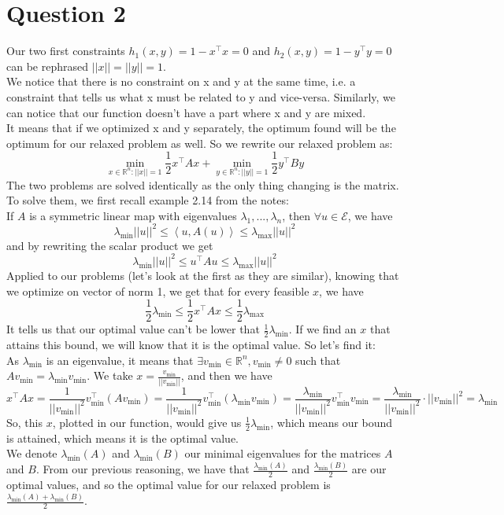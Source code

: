 \documentclass{article}
\newcommand{\R}{\mathbb{R}}
\begin{document}
\section*{Question 2}

Our two first constraints $h_1(x,y)=1-x^\top x =0$ and $h_2(x,y)=1-y^\top y =0$ can be rephrased $||x||=||y||=1$.\\
We notice that there is no constraint on x and y at the same time, i.e. a constraint that tells us what x must be related to y and vice-versa. Similarly, we can notice that our function doesn't have a part where x and y are mixed.\\
It means that if we optimized x and y separately, the optimum found will be the optimum for our relaxed problem as well. So we rewrite our relaxed problem as:
$$\min_{x\in \R^n:||x||=1}  \frac{1}{2} x^\top A x +\min_{y \in \R^n:||y||=1} \frac{1}{2} y^\top B y$$
The two problems are solved identically as the only thing changing is the matrix. To solve them, we first recall example 2.14 from the notes:\\
If $A$ is a symmetric linear map with eigenvalues $\lambda_1, ...,\lambda_n$, then $\forall u \in \mathcal{E}$, we have $$\lambda_{\min} ||u||^2 \leq \left< u, A(u)\right>\leq \lambda_{\max}||u||^2$$
and by rewriting the scalar product we get 
$$\lambda_{\min} ||u||^2 \leq u^\top A u \leq \lambda_{\max} ||u||^2$$
Applied to our problems (let's look at the first as they are similar), knowing that we optimize on vector of norm 1, we get that for every feasible $x$, we have
$$\frac{1}{2}\lambda_{\min}  \leq\frac{1}{2} x^\top A x \leq\frac{1}{2} \lambda_{\max} $$
It tells us that our optimal value can't be lower that $\frac{1}{2} \lambda_{\min}$. If we find an $x$ that attains this bound, we will know that it is the optimal value. So let's find it:\\
As $\lambda_{\min}$ is an eigenvalue, it means that $\exists v_{\min} \in \R^n, v_{\min} \neq 0$ such that $A v_{\min}=\lambda_{\min} v_{\min}$. We take $x=\frac{v_{\min}}{||v_{\min}||}$, and then we have
$$x^\top A x =\frac{1}{||v_{\min}||^2} v_{\min}^\top \left( A v_{\min} \right)=\frac{1}{||v_{\min}||^2} v_{\min}^\top (\lambda_{\min} v_{\min})=\frac{\lambda_{\min}}{||v_{\min}||^2} v_{\min}^\top v_{\min}=\frac{\lambda_{\min}}{||v_{\min}||^2} \cdot ||v_{\min}||^2=\lambda_{\min}$$
So, this $x$, plotted in our function, would give us $\frac{1}{2}\lambda_{\min} $, which means our bound is attained, which means it is the optimal value. \\
We denote $\lambda_{\min} (A)$ and $\lambda_{\min} (B)$ our minimal eigenvalues for the matrices $A$ and $B$. From our previous reasoning, we have that $\frac{\lambda_{\min} (A)}{2}$ and $\frac{\lambda_{\min} (B)}{2}$ are our optimal values, and so the optimal value for our relaxed problem is $\frac{\lambda_{\min} (A)+\lambda_{\min} (B)}{2}$.
\end{document}
